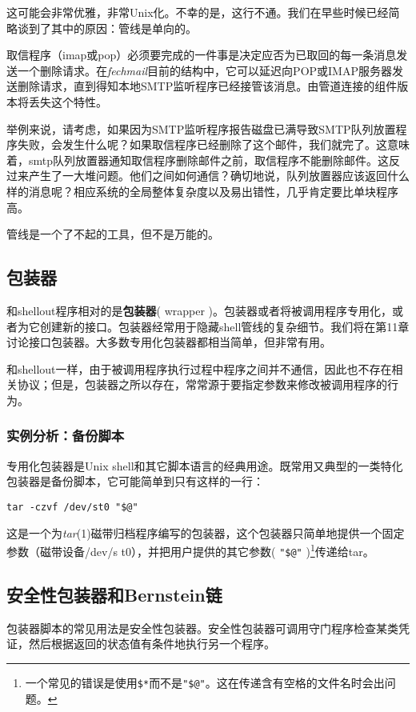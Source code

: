 \documentclass[12pt,oneside]{book}
\begin{document}
\begin{common-format}
这可能会非常优雅，非常Unix化。不幸的是，这行不通。我们在早些时候已经简略谈到了其中的原因：管线是单向的。

取信程序（imap或pop）必须要完成的一件事是决定应否为已取回的每一条消息发送一个删除请求。在\textit{fechmail}目前的结构中，它可以延迟向POP或IMAP服务器发送删除请求，直到得知本地SMTP监听程序已经接管该消息。由管道连接的组件版本将丢失这个特性。

举例来说，请考虑，如果因为SMTP监听程序报告磁盘已满导致SMTP队列放置程序失败，会发生什么呢？如果取信程序已经删除了这个邮件，我们就完了。这意味着，smtp队列放置器通知取信程序删除邮件之前，取信程序不能删除邮件。这反过来产生了一大堆问题。他们之间如何通信？确切地说，队列放置器应该返回什么样的消息呢？相应系统的全局整体复杂度以及易出错性，几乎肯定要比单块程序高。

管线是一个了不起的工具，但不是万能的。


\subsection{包装器}
和shellout程序相对的是\textbf{包装器}( wrapper )。包装器或者将被调用程序专用化，或者为它创建新的接口。包装器经常用于隐藏shell管线的复杂细节。我们将在第11章讨论接口包装器。大多数专用化包装器都相当简单，但非常有用。

和shellout一样，由于被调用程序执行过程中程序之间并不通信，因此也不存在相关协议；但是，包装器之所以存在，常常源于要指定参数来修改被调用程序的行为。


\subsubsection{实例分析：备份脚本}
专用化包装器是Unix shell和其它脚本语言的经典用途。既常用又典型的一类特化包装器是备份脚本，它可能简单到只有这样的一行：
\begin{Verbatim}
tar -czvf /dev/st0 "$@"
\end{Verbatim}

这是一个为\textit{tar}(1)磁带归档程序编写的包装器，这个包装器只简单地提供一个固定参数（磁带设备/dev/s t0），并把用户提供的其它参数( \verb+"$@"+ )\footnote{一个常见的错误是使用\verb+$*+而不是\verb+"$@"+。这在传递含有空格的文件名时会出问题。}传递给tar。


\subsection{安全性包装器和Bernstein链}
包装器脚本的常见用法是安全性包装器。安全性包装器可调用守门程序检查某类凭证，然后根据返回的状态值有条件地执行另一个程序。


\end{common-format}
\end{document}
